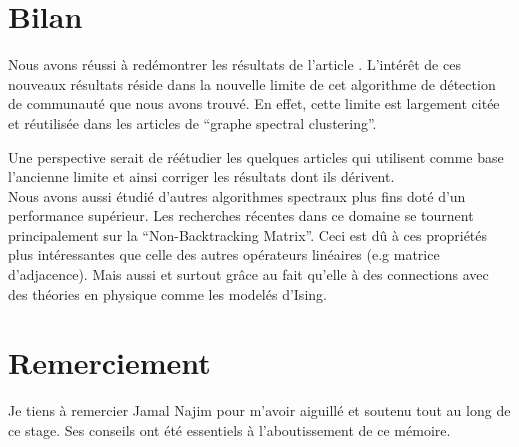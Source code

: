 \section*{Bilan}
Nous avons réussi à redémontrer les résultats de l'article \cite{raj_rao}.
L'intérêt de ces nouveaux résultats réside dans la nouvelle limite de cet algorithme de détection de communauté que nous avons trouvé.
En effet, cette limite est largement citée et réutilisée dans les articles de ``graphe spectral clustering''.

Une perspective serait de réétudier les quelques articles qui utilisent comme base l’ancienne limite et ainsi corriger les résultats dont ils dérivent.\\

Nous avons aussi étudié d'autres algorithmes spectraux plus fins doté d'un performance supérieur.
Les recherches récentes dans ce domaine se tournent principalement sur la ``Non-Backtracking Matrix''.
Ceci est dû à ces propriétés plus intéressantes que celle des autres opérateurs linéaires (e.g matrice d'adjacence).
Mais aussi et surtout grâce au fait qu'elle à des connections avec des théories en physique comme les modelés d'Ising.

\section*{Remerciement}
Je tiens à remercier Jamal Najim pour m'avoir aiguillé et soutenu tout au long de ce stage.
Ses conseils ont été essentiels à l'aboutissement de ce mémoire.

\newpage